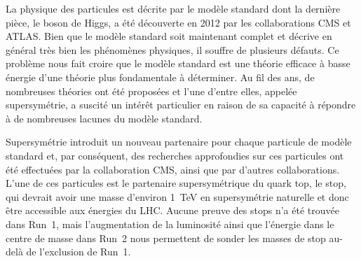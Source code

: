 La physique des particules est décrite par le modèle standard dont la dernière pièce, le boson de Higgs, a été découverte en 2012 par les collaborations CMS et ATLAS. Bien que le modèle standard soit maintenant complet et décrive en général très bien les phénomènes physiques, il souffre de plusieurs défauts. Ce problème nous fait croire que le modèle standard est une théorie efficace à basse énergie d’une théorie plus fondamentale à déterminer. Au fil des ans, de nombreuses théories ont été proposées et l'une d'entre elles, appelée supersymétrie, a suscité un intérêt particulier en raison de sa capacité à répondre à de nombreuses lacunes du modèle standard.

Supersymétrie introduit un nouveau partenaire pour chaque particule de modèle standard et, par conséquent, des recherches approfondies sur ces particules ont été effectuées par la collaboration CMS, ainsi que par d’autres collaborations. L'une de ces particules est le partenaire supersymétrique du quark top, le stop, qui devrait avoir une masse d'environ 1~TeV en supersymétrie naturelle et donc être accessible aux énergies du LHC. Aucune preuve des stops n'a été trouvée dans Run~1, mais l'augmentation de la luminosité ainsi que l'énergie dans le centre de masse dans Run~2 nous permettent de sonder les masses de stop au-delà de l'exclusion de Run~1.

\vspace*{1cm}

